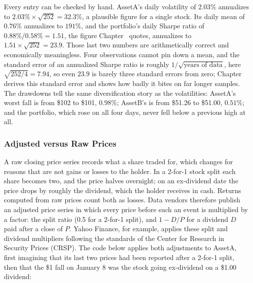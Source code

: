 \documentclass[../ai_in_finance]{subfiles}
\begin{document}
Every entry can be checked by hand. AssetA's daily volatility of $2.03\%$ annualizes to $2.03\% \times \sqrt{252} = 32.3\%$, a plausible figure for a single stock. Its daily mean of $0.76\%$ annualizes to $191\%$, and the portfolio's daily Sharpe ratio of $0.88\%/0.58\% = 1.51$, the figure Chapter~ quotes, annualizes to $1.51 \times \sqrt{252} = 23.9$. Those last two numbers are arithmetically correct and economically meaningless. Four observations cannot pin down a mean, and the standard error of an annualized Sharpe ratio is roughly $1/\sqrt{\text{years of data}}$, here $\sqrt{252/4} = 7.94$, so even $23.9$ is barely three standard errors from zero; Chapter~ derives this standard error and shows how badly it bites on far longer samples. The drawdowns tell the same diversification story as the volatilities: AssetA's worst fall is from \$102 to \$101, $0.98\%$; AssetB's is from \$51.26 to \$51.00, $0.51\%$; and the portfolio, which rose on all four days, never fell below a previous high at all.

\subsubsection*{Adjusted versus Raw Prices}

A raw closing price series records what a share traded for, which changes for reasons that are not gains or losses to the holder. In a 2-for-1 stock split each share becomes two, and the price halves overnight; on an ex-dividend date the price drops by roughly the dividend, which the holder receives in cash. Returns computed from raw prices count both as losses. Data vendors therefore publish an adjusted price series in which every price before such an event is multiplied by a factor: the split ratio (0.5 for a 2-for-1 split), and $1 - D/P$ for a dividend $D$ paid after a close of $P$. Yahoo Finance, for example, applies these split and dividend multipliers following the standards of the Center for Research in Security Prices (CRSP). The code below applies both adjustments to AssetA, first imagining that its last two prices had been reported after a 2-for-1 split, then that the \$1 fall on January 8 was the stock going ex-dividend on a \$1.00 dividend:
\end{document}
